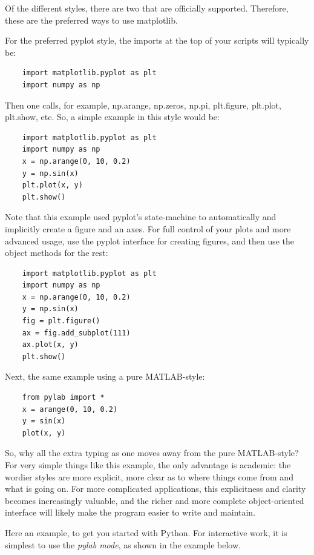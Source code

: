 Of the different styles, there are two that are officially supported. Therefore, these are the preferred ways to use matplotlib.

For the preferred pyplot style, the imports at the top of your scripts will typically be:

\begin{lstlisting}
    import matplotlib.pyplot as plt
    import numpy as np
\end{lstlisting}

Then one calls, for example, np.arange, np.zeros, np.pi, plt.figure, plt.plot, plt.show, etc. So, a simple example in this style would be:

\begin{lstlisting}
    import matplotlib.pyplot as plt
    import numpy as np
    x = np.arange(0, 10, 0.2)
    y = np.sin(x)
    plt.plot(x, y)
    plt.show()
\end{lstlisting}

Note that this example used pyplot's state-machine to automatically and implicitly create a figure and an axes. For full control of your plots and more advanced usage, use the pyplot interface for creating figures, and then use the object methods for the rest:

\begin{lstlisting}
    import matplotlib.pyplot as plt
    import numpy as np
    x = np.arange(0, 10, 0.2)
    y = np.sin(x)
    fig = plt.figure()
    ax = fig.add_subplot(111)
    ax.plot(x, y)
    plt.show()
\end{lstlisting}

Next, the same example using a pure MATLAB-style:

\begin{lstlisting}
    from pylab import *
    x = arange(0, 10, 0.2)
    y = sin(x)
    plot(x, y)
\end{lstlisting}

So, why all the extra typing as one moves away from the pure MATLAB-style? For very simple things like this example, the only advantage is academic: the wordier styles are more explicit, more clear as to where things come from and what is going on. For more complicated applications, this explicitness and clarity becomes increasingly valuable, and the richer and more complete object-oriented interface will likely make the program easier to write and maintain.

Here an example, to get you started with Python. For interactive work, it is
simplest to use the \emph{pylab mode}, as shown in the example below.

